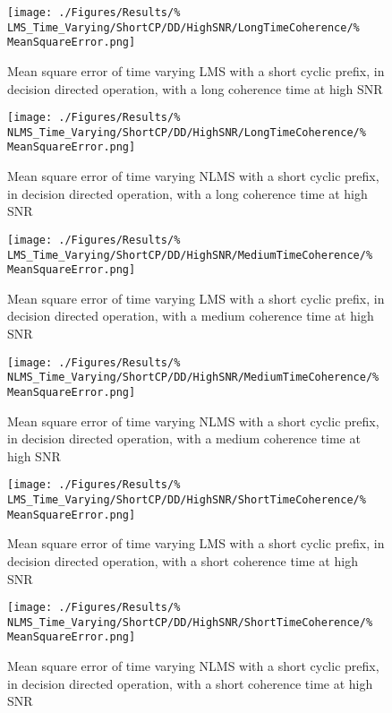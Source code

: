 \begin{figure}[ht]
	\centering
	\begin{minipage}{0.49\textwidth}
		\centering
		\texttt{[image: ./Figures/Results/\%
	LMS\_Time\_Varying/ShortCP/DD/HighSNR/LongTimeCoherence/\%
	MeanSquareError.png]}
		\captionsetup{width=0.75\linewidth}
		\caption{Mean square error of time varying LMS with a 
		short cyclic prefix, in decision directed operation, 
		with a long coherence time at high SNR}
	\end{minipage}
	\begin{minipage}{0.49\textwidth}
		\centering
		\texttt{[image: ./Figures/Results/\%
	NLMS\_Time\_Varying/ShortCP/DD/HighSNR/LongTimeCoherence/\%
	MeanSquareError.png]}
		\captionsetup{width=0.75\linewidth}
		\caption{Mean square error of time varying NLMS with 
		a short cyclic prefix, in decision directed 
		operation, with a long coherence time at high SNR}
	\end{minipage}
\end{figure}

\begin{figure}[ht]
	\centering
	\begin{minipage}{0.49\textwidth}
		\centering
		\texttt{[image: ./Figures/Results/\%
	LMS\_Time\_Varying/ShortCP/DD/HighSNR/MediumTimeCoherence/\%
	MeanSquareError.png]}
		\captionsetup{width=0.75\linewidth}
		\caption{Mean square error of time varying LMS with a 
		short cyclic prefix, in decision directed operation, 
		with a medium coherence time at high SNR}
	\end{minipage}
	\begin{minipage}{0.49\textwidth}
		\centering
		\texttt{[image: ./Figures/Results/\%
	NLMS\_Time\_Varying/ShortCP/DD/HighSNR/MediumTimeCoherence/\%
	MeanSquareError.png]}
		\captionsetup{width=0.75\linewidth}
		\caption{Mean square error of time varying NLMS with 
		a short cyclic prefix, in decision directed 
		operation, with a medium coherence time at high SNR}
	\end{minipage}
\end{figure}

\begin{figure}[ht]
	\centering
	\begin{minipage}{0.49\textwidth}
		\centering
		\texttt{[image: ./Figures/Results/\%
	LMS\_Time\_Varying/ShortCP/DD/HighSNR/ShortTimeCoherence/\%
	MeanSquareError.png]}
		\captionsetup{width=0.75\linewidth}
		\caption{Mean square error of time varying LMS with a 
		short cyclic prefix, in decision directed operation, 
		with a short coherence time at high SNR}
	\end{minipage}
	\begin{minipage}{0.49\textwidth}
		\centering
		\texttt{[image: ./Figures/Results/\%
	NLMS\_Time\_Varying/ShortCP/DD/HighSNR/ShortTimeCoherence/\%
	MeanSquareError.png]}
		\captionsetup{width=0.75\linewidth}
		\caption{Mean square error of time varying NLMS with 
		a short cyclic prefix, in decision directed 
		operation, with a short coherence time at high SNR}
		\label{fig:NLMS-Short-High-Directed-Short}
	\end{minipage}
\end{figure}


